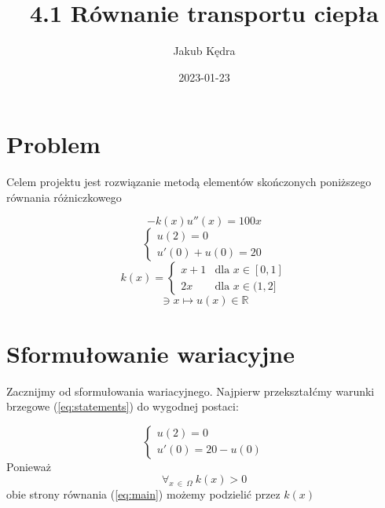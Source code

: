\documentclass[12pt]{article}
\title{4.1 Równanie transportu ciepła}
\author{Jakub Kędra}
\date{2023-01-23}
\begin{document}
\maketitle


\section{Problem}

Celem projektu jest rozwiązanie metodą elementów skończonych poniższego równania różniczkowego

\begin{equation} \label{eq:main}
    -k(x) u''(x) = 100x
\end{equation}
% 
\begin{equation} \label{eq:statements}
    \begin{cases}
        u(2) = 0 \\
        u'(0) + u(0) = 20
    \end{cases}
\end{equation}
% 
\begin{equation}
    k(x) = 
    \begin{cases}
        x + 1 & \text{dla } x \in [0,1]\\
        2x & \text{dla } x \in (1,2]
    \end{cases}
\end{equation}
% 
\begin{equation}
    [0,2] \ni x \mapsto  u(x) \in \mathbb{R}   
\end{equation}


\section{Sformułowanie wariacyjne}

Zacznijmy od sformułowania wariacyjnego. Najpierw przekształćmy warunki brzegowe (\ref{eq:statements}) do wygodnej postaci:

\begin{equation} 
    \begin{cases}
        u(2) = 0 \\
        u'(0) = 20 - u(0) 
    \end{cases}
\end{equation}
% 
Ponieważ 
\begin{equation}
    \forall_{x\ \in\ \Omega}\ k(x) > 0  
\end{equation}
obie strony równania (\ref{eq:main}) możemy podzielić przez $k(x)$ 
\end{document}
